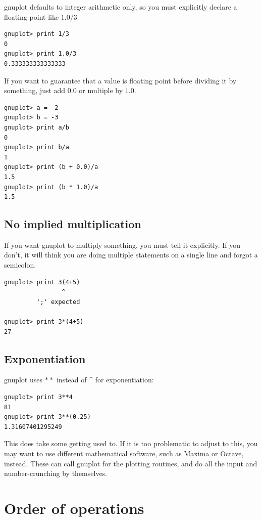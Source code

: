 \documentclass[11pt,letterpaper]{report}
\begin{document}
gnuplot defaults to integer arithmetic only, so you must explicitly declare a floating point like $1.0/3$
\begin{lstlisting}
gnuplot> print 1/3
0
gnuplot> print 1.0/3
0.333333333333333
\end{lstlisting}

If you want to guarantee that a value is floating point before dividing it by something, just add $0.0$ or multiple by $1.0$.

\begin{lstlisting}
gnuplot> a = -2
gnuplot> b = -3
gnuplot> print a/b
0
gnuplot> print b/a
1
gnuplot> print (b + 0.0)/a
1.5
gnuplot> print (b * 1.0)/a
1.5
\end{lstlisting}

\subsection{No implied multiplication}

If you want gnuplot to multiply something, you must tell it explicitly. If you don't, it will think you are doing multiple statements on a single line and forgot a semicolon.

\begin{verbatim}
gnuplot> print 3(4+5)
                ^
         ';' expected
         
gnuplot> print 3*(4+5)
27
\end{verbatim}

\subsection{Exponentiation}

gnuplot uses
$**$
instead of 
\^{}
for exponentiation:
\begin{lstlisting}
gnuplot> print 3**4
81
gnuplot> print 3**(0.25)
1.31607401295249
\end{lstlisting}

This does take some getting used to. If it is too problematic to adjust to this, you may want to use different mathematical software, such as Maxima or Octave, instead. These can call gnuplot for the plotting routines, and do all the input and number-crunching by themselves.

\section{Order of operations}

\end{document}

